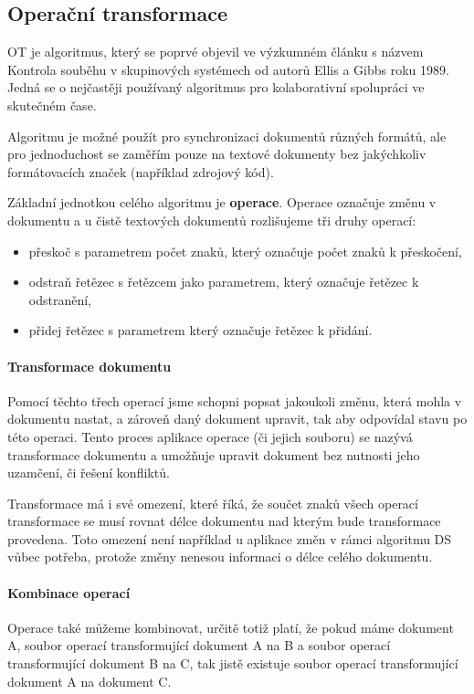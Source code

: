 \subsection{Operační transformace}\label{subsec:operacniTransformace}

\gls{OT} je algoritmus, který se poprvé objevil ve výzkumném článku s názvem Kontrola souběhu v skupinových systémech od autorů Ellis a Gibbs roku 1989.
Jedná se o nejčastěji používaný algoritmus pro kolaborativní spolupráci ve skutečném čase.~\cite{ot:intro}

Algoritmu je možné použít pro synchronizaci dokumentů různých formátů, ale pro jednoduchost se zaměřím pouze na textové dokumenty bez jakýchkoliv formátovacích značek (například zdrojový kód).

Základní jednotkou celého algoritmu je \textbf{operace}.
Operace označuje změnu v dokumentu a u čistě textových dokumentů rozlišujeme tři druhy operací:
\begin{itemize}
    \item přeskoč s parametrem počet znaků, který označuje počet znaků k přeskočení,
    \item odstraň řetězec s řetězcem jako parametrem, který označuje řetězec k odstranění,
    \item přidej řetězec s parametrem který označuje řetězec k přidání.~\cite{ot:aboutOT}
\end{itemize}

\paragraph{Transformace dokumentu}
Pomocí těchto třech operací jsme schopni popsat jakoukoli změnu, která mohla v dokumentu nastat, a zároveň daný dokument upravit, tak aby odpovídal stavu po této operaci.
Tento proces aplikace operace (či jejich souboru) se nazývá transformace dokumentu a umožňuje upravit dokument bez nutnosti jeho uzamčení, či řešení konfliktů.

Transformace má i své omezení, které říká, že součet znaků všech operací transformace se musí rovnat délce dokumentu nad kterým bude transformace provedena.
Toto omezení není například u aplikace změn v rámci algoritmu \gls{DS} vůbec potřeba, protože změny nenesou informaci o délce celého dokumentu.

\paragraph{Kombinace operací}
Operace také můžeme kombinovat, určitě totiž platí, že pokud máme dokument A, soubor operací transformující dokument A na B a soubor operací transformující dokument B na C, tak jistě existuje soubor operací transformující dokument A na dokument C.

